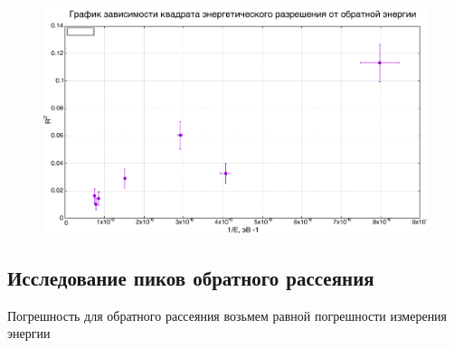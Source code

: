	\begin{figure}[h]
		\includegraphics[width=\linewidth]{../data/re.pdf}
	\end{figure}

 	\newpage

	\subsection{Исследование пиков обратного рассеяния}
	
	Погрешность для обратного рассеяния возьмем равной погрешности измерения энергии
	
